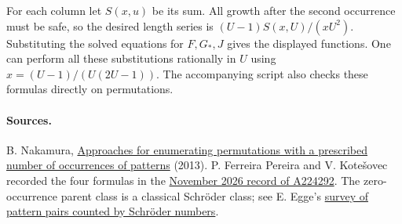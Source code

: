 \documentclass[11pt,letterpaper]{article}
\begin{document}
For each column let \(S(x,u)\) be its sum. All growth after the second occurrence must be safe, so the desired length series is \((U-1)S(x,U)/(xU^2)\). Substituting the solved equations for \(F,G_*,J\) gives the displayed functions. One can perform all these substitutions rationally in \(U\) using \(x=(U-1)/(U(2U-1))\). The accompanying script also checks these formulas directly on permutations.

\paragraph{Sources.}
B. Nakamura, \href{https://arxiv.org/abs/1301.5080}{Approaches for enumerating permutations with a prescribed number of occurrences of patterns} (2013). P. Ferreira Pereira and V. Kote\v{s}ovec recorded the four formulas in the \href{https://github.com/oeis/oeisdata/blob/976b0c73e00453b1c1e6f16d83108cb9bb744c3b/seq/A224/A224292.seq}{November 2026 record of A224292}. The zero-occurrence parent class is a classical Schröder class; see E. Egge's \href{https://www.ericegge.net/slides/schroder_slides.pdf}{survey of pattern pairs counted by Schröder numbers}.
\end{document}
